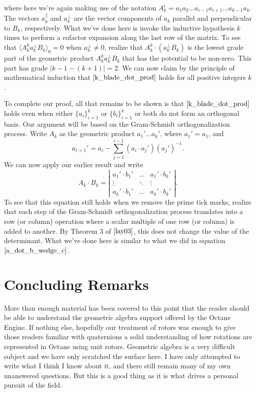 \documentclass{article}
\newcommand{\prl}{\parallel}
\newcommand{\prp}{\perp}
\begin{document}
where here we're again making use of the notation $A_k^i=a_1a_2\dots a_{i-1}a_{i+1}\dots a_{k-1}a_k$.
The vectors $a_k^{\prl}$ and $a_k^{\prp}$ are the vector components of $a_k$ parallel
and perpendicular to $B_k$, respectively.  What we've done here is invoke the inductive
hypothesis $k$ times to perform a cofactor expansion along the last row of the matrix.
To see that $\langle A_k^ka_k^{\prp}B_k\rangle_0=0$ when $a_k^{\prp}\neq 0$, realize
that $A_k^k\cdot(a_k^{\prp}B_k)$ is the lowest grade part of the geometric product
$A_k^ka_k^{\prp}B_k$ that has the potential to be non-zero.  This part has grade $|k-1-(k+1)|=2$.
We can now claim by the principle of mathematical induction that $\eqref{k_blade_dot_prod}$
holds for all positive integers $k$.

To complete our proof, all that remains to be shown is that $\eqref{k_blade_dot_prod}$
holds even when either $\{a_i\}_{i=1}^k$ or $\{b_i\}_{i=1}^k$ or both do not form an
orthogonal basis.  Our argument will be based on the Gram-Schmidt orthogonalization
process.  Write $A_k$ as the geometric product $a_1'\dots a_k'$, where $a_1'=a_1$,
and
\begin{equation*}
a_{i>1}' = a_i - \sum_{j=1}^{i-1}(a_i\cdot a_j')(a_j')^{-1}.
\end{equation*}
We can now apply our earlier result and write
\begin{equation*}
A_k\cdot B_k = \left|\begin{array}{ccc}
a_1'\cdot b_1' & \dots & a_1'\cdot b_k' \\
\vdots & \ddots & \vdots \\
a_k'\cdot b_1' & \dots & a_k'\cdot b_k'
\end{array}\right|.
\end{equation*}
To see that this equation still holds when we remove the prime tick marks,
realize that each step of the Gram-Schmidt orthogonalization process translates
into a row (or column) operation where a scalar multiple of one row (or column) is
added to another.  By Theorem 3 of $\cite[p. 192]{lay03}$, this does not change
the value of the determinant.  What we've done here is similar to what we did
in equation $\eqref{a_dot_b_wedge_c}$.

\section{Concluding Remarks}

More than enough material has been covered to this point that the reader should
be able to understand the geometric algebra support offered by the
Octane Engine.  If nothing else, hopefully our treatment of rotors was
enough to give those readers familiar with quaternions a solid understanding
of how rotations are represented in Octane using unit rotors.  Geometric algebra
is a very difficult subject and we have only scratched the surface here.
I have only attempted to write what I think I know about it, and there still remain
many of my own unanswered questions.  But this is a good thing as it is what
drives a personal pursuit of the field.
\end{document}
